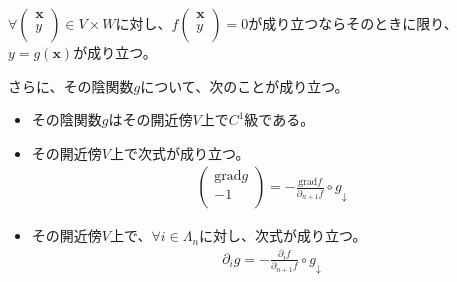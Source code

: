 \documentclass[dvipdfmx]{jsarticle}
\begin{document}
\begin{thm}[陰関数定理]
\begin{itemize}
  $\forall\begin{pmatrix}
  \mathbf{x} \\
  y \\
  \end{pmatrix} \in V \times W$に対し、$f\begin{pmatrix}
  \mathbf{x} \\
  y \\
  \end{pmatrix} = 0$が成り立つならそのときに限り、$y = g\left( \mathbf{x} \right)$が成り立つ。
\end{itemize}
さらに、その陰関数$g$について、次のことが成り立つ。
\begin{itemize}
\item
  その陰関数$g$はその開近傍$V$上で$C^{1}$級である。
\item
  その開近傍$V$上で次式が成り立つ。
\begin{align*}
\begin{pmatrix}
\mathrm{grad}g \\
 - 1 \\
\end{pmatrix} = - \frac{\mathrm{grad}f}{\partial_{n + 1}f} \circ g_{\downarrow}
\end{align*}
\item
  その開近傍$V$上で、$\forall i \in \varLambda_{n}$に対し、次式が成り立つ。
\begin{align*}
\partial_{i}g = - \frac{\partial_{i}f}{\partial_{n + 1}f} \circ g_{\downarrow}
\end{align*}
\end{itemize}
\end{thm}
\end{document}
